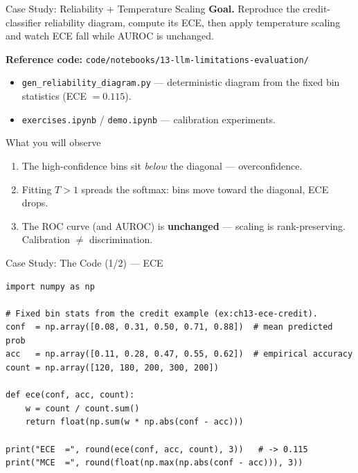 \documentclass[9pt,t]{beamer}
\begin{document}
\begin{frame}{Case Study: Reliability + Temperature Scaling}
\textbf{Goal.} Reproduce the credit-classifier reliability diagram, compute its
ECE, then apply temperature scaling and watch ECE fall while AUROC is unchanged.

\medskip
\textbf{Reference code:}
\texttt{code/notebooks/13-llm-limitations-evaluation/}
\begin{itemize}
  \item \texttt{gen\_reliability\_diagram.py} --- deterministic diagram from the
        fixed bin statistics (ECE $=0.115$).
  \item \texttt{exercises.ipynb} / \texttt{demo.ipynb} --- calibration experiments.
\end{itemize}

\medskip
\begin{block}{What you will observe}
\begin{enumerate}
  \item The high-confidence bins sit \emph{below} the diagonal --- overconfidence.
  \item Fitting $T>1$ spreads the softmax: bins move toward the diagonal, ECE drops.
  \item The ROC curve (and AUROC) is \textbf{unchanged} --- scaling is
        rank-preserving. Calibration $\neq$ discrimination.
\end{enumerate}
\end{block}
\end{frame}

\begin{frame}[fragile]{Case Study: The Code (1/2) --- ECE}
\begin{lstlisting}
import numpy as np

# Fixed bin stats from the credit example (ex:ch13-ece-credit).
conf  = np.array([0.08, 0.31, 0.50, 0.71, 0.88])  # mean predicted prob
acc   = np.array([0.11, 0.28, 0.47, 0.55, 0.62])  # empirical accuracy
count = np.array([120, 180, 200, 300, 200])

def ece(conf, acc, count):
    w = count / count.sum()
    return float(np.sum(w * np.abs(conf - acc)))

print("ECE  =", round(ece(conf, acc, count), 3))   # -> 0.115
print("MCE  =", round(float(np.max(np.abs(conf - acc))), 3))
\end{lstlisting}
\end{frame}
\end{document}
